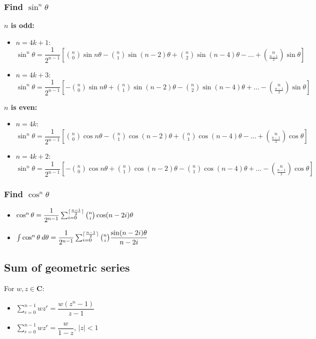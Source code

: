 \subsubsection{Find $\sin^n\theta$}
\textbf{$n$ is odd:}
\begin{itemize}
	\item $n=4k+1$: $\sin^n\theta=\dfrac{1}{2^{n-1}}[\binom{n}{0}\sin n\theta - \binom{n}{1}\sin (n-2)\theta + \binom{n}{2}\sin (n-4)\theta - \dots + \binom{n}{\frac{n-1}{2}}\sin \theta]$
	\item $n=4k+3$: $\sin^n\theta=\dfrac{1}{2^{n-1}}[-\binom{n}{0}\sin n\theta + \binom{n}{1}\sin (n-2)\theta - \binom{n}{2}\sin (n-4)\theta + \dots - \binom{n}{\frac{n-1}{2}}\sin \theta]$
\end{itemize}
\textbf{$n$ is even:}
\begin{itemize}
	\item $n=4k$: $\sin^n\theta=\dfrac{1}{2^{n-1}}[\binom{n}{0}\cos n\theta - \binom{n}{1}\cos (n-2)\theta + \binom{n}{1}\cos (n-4)\theta - \dots + \binom{n}{\frac{n-1}{2}}\cos \theta]$
	\item $n=4k+2$: $\sin^n\theta=\dfrac{1}{2^{n-1}}[-\binom{n}{0}\cos n\theta + \binom{n}{1}\cos (n-2)\theta - \binom{n}{1}\cos (n-4)\theta + \dots - \binom{n}{\frac{n-1}{2}}\cos \theta]$
\end{itemize}
\subsubsection{Find $\cos^n\theta$}
\begin{itemize}
	\item $\cos^n\theta = \dfrac{1}{2^{n-1}}\sum_{i=0}^{\lceil\frac{n-1}{2}\rceil} \binom{n}{i}\cos (n-2i)\theta$
	\item $\int \cos^n\theta \: d\theta = \dfrac{1}{2^{n-1}} \sum_{i=0}^{\lceil\frac{n-1}{2}\rceil} \binom{n}{i} \dfrac{\sin (n-2i)\theta}{n-2i}$
\end{itemize}

\subsection{Sum of geometric series}
For $w, z \in \textbf{C}$:
\begin{itemize}
	\item $\sum\limits_{r=0}^{n-1}wz^r=\dfrac{w(z^n-1)}{z-1}$
	\item $\sum\limits_{r=0}^{n-1}wz^r=\dfrac{w}{1-z}$, $|z|<1$
\end{itemize}

